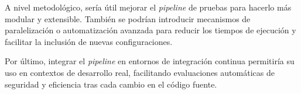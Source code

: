A nivel metodológico, sería útil mejorar el \emph{pipeline} de pruebas para hacerlo más modular y extensible. También se podrían introducir mecanismos de paralelización o automatización avanzada para reducir los tiempos de ejecución y facilitar la inclusión de nuevas configuraciones.

Por último, integrar el \emph{pipeline} en entornos de integración continua permitiría su uso en contextos de desarrollo real, facilitando evaluaciones automáticas de seguridad y eficiencia tras cada cambio en el código fuente.
